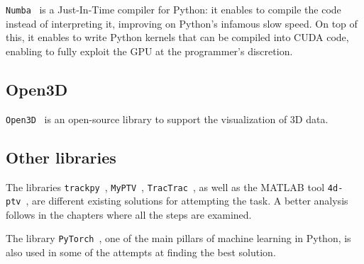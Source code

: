 \texttt{Numba}~\cite{numba} is a Just-In-Time compiler for Python: it enables to compile the code instead of interpreting it, improving on Python's infamous slow speed.
On top of this, it enables to write Python kernels that can be compiled into CUDA code, enabling to fully exploit the GPU at the programmer's discretion.

\subsection{Open3D}

\texttt{Open3D}~\cite{open3d} is an open-source library to support the visualization of 3D data.

\subsection{Other libraries}

The libraries \texttt{trackpy}~\cite{trackpy}, \texttt{MyPTV}~\cite{myptv}, \texttt{TracTrac}~\cite{tractrac}, as well as the MATLAB tool \texttt{4d-ptv}~\cite{fourdptv}, are different existing solutions for attempting the task. A better analysis follows in the chapters where all the steps are examined.

The library \texttt{PyTorch}~\cite{pytorch}, one of the main pillars of machine learning in Python, is also used in some of the attempts at finding the best solution.
